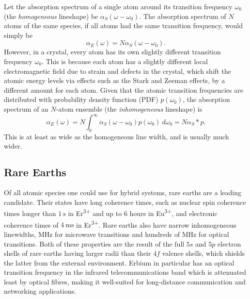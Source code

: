 Let the absorption spectrum of a single atom around its transition frequency $\omega_0$ (the \textit{homogeneous} lineshape) be $\alpha_S(\omega-\omega_0)$. The absorption spectrum of $N$ atoms of the same species, if all atoms had the same transition frequency, would simply be
\begin{equation}
    \alpha_E(\omega) = N\alpha_S(\omega-\omega_0).
\end{equation}
However, in a crystal, every atom has its own slightly different transition frequency $\omega_0$. This is because each atom has a slightly different local electromagnetic field due to strain and defects in the crystal, which shift the atomic energy levels via effects such as the Stark and Zeeman effects, by a different amount for each atom. Given that the atomic transition frequencies are distributed with probability density function (PDF) $p(\omega_0)$, the absorption spectrum of an $N$-atom ensemble (the \textit{inhomogeneous} lineshape) is
\begin{equation}
    \label{eq:inhomogeneous_convolution}
    \alpha_E(\omega) = N \int_0^\infty \alpha_S(\omega-\omega_0)p(\omega_0)\:d\omega_0 = N\alpha_S * p.
\end{equation}
This is at least as wide as the homogeneous line width, and is usually much wider.

\subsection{Rare Earths}
Of all atomic species one could use for hybrid systems, rare earths are a leading candidate. Their states have long coherence times, such as nuclear spin coherence times longer than $\qty{1}{\second}$ in Er\textsuperscript{3+}\cite{ranvcic_2018} and up to 6 hours in Eu\textsuperscript{3+}\cite{zhong_2015}, and electronic coherence times of $\qty{4}{\milli\second}$ in Er\textsuperscript{3+}\cite{bottger_2009}. Rare earths also have narrow inhomogeneous linewidths\cite{vleck_1937}, $\unit{\mega\hertz}$ for microwave transitions and hundreds of $\unit{\mega\hertz}$ for optical transitions. Both of these properties are the result of the full $5s$ and $5p$ electron shells of rare earths having larger radii than their $4f$ valence shells, which shields the latter from the external environment\cite{wybourne_book}. Erbium in particular has an optical transition frequency in the infrared telecommunications band which is attenuated least by optical fibres, making it well-suited for long-distance communication and networking applications.

